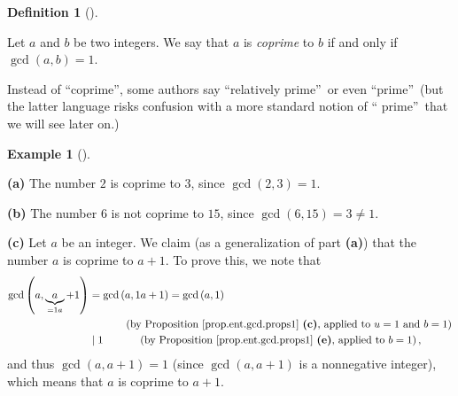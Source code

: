 \documentclass[numbers=enddot,12pt,final,onecolumn,notitlepage]{scrartcl}%
\numberwithin{exer}{subsection}
\theoremstyle{definition}
\newtheorem{defi}[theo]{Definition}
\newenvironment{definition}[1][]
{\begin{defi}[#1]\begin{leftbar}}
{\end{leftbar}\end{defi}}
\newtheorem{exam}[theo]{Example}
\newenvironment{example}[1][]
{\begin{exam}[#1]\begin{leftbar}}
{\end{leftbar}\end{exam}}
\begin{document}
\begin{definition}
\label{def.ent.coprime.coprime}Let $a$ and $b$ be two integers. We say that
$a$ is \textit{coprime} to $b$ if and only if $\gcd\left(  a,b\right)  =1$.
\end{definition}

Instead of \textquotedblleft coprime\textquotedblright, some authors say
\textquotedblleft relatively prime\textquotedblright\ or even
\textquotedblleft prime\textquotedblright\ (but the latter language risks
confusion with a more standard notion of \textquotedblleft
prime\textquotedblright\ that we will see later on.)

\begin{example}
\label{exa.ent.coprime.1}\textbf{(a)} The number $2$ is coprime to $3$, since
$\gcd\left(  2,3\right)  =1$.

\textbf{(b)} The number $6$ is not coprime to $15$, since $\gcd\left(
6,15\right)  =3\neq1$.

\textbf{(c)} Let $a$ be an integer. We claim (as a generalization of part
\textbf{(a)}) that the number $a$ is coprime to $a+1$. To prove this, we note
that%
\begin{align*}
\gcd\left(  a,\underbrace{a}_{=1a}+1\right)   &  =\gcd\left(  a,1a+1\right)
=\gcd\left(  a,1\right) \\
&  \ \ \ \ \ \ \ \ \ \ \left(  \text{by Proposition \ref{prop.ent.gcd.props1}
\textbf{(c)}, applied to }u=1\text{ and }b=1\right) \\
&  \mid1\ \ \ \ \ \ \ \ \ \ \left(  \text{by Proposition
\ref{prop.ent.gcd.props1} \textbf{(e)}, applied to }b=1\right)  ,
\end{align*}
and thus $\gcd\left(  a,a+1\right)  =1$ (since $\gcd\left(  a,a+1\right)  $ is
a nonnegative integer), which means that $a$ is coprime to $a+1$.


\end{example}
\end{document}
